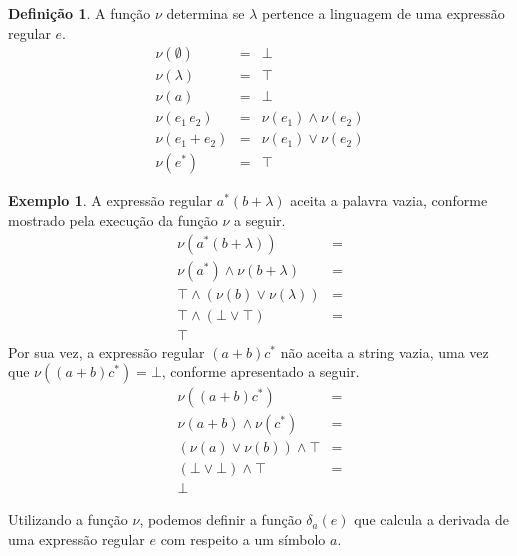 \documentclass[a4paper]{article}
\theoremstyle{definition}
\newtheorem{Example}{Exemplo}
\newtheorem{Definition}{Definição}
\begin{document}
  \begin{Definition}
    A função $\nu$ determina se $\lambda$ pertence a linguagem de uma expressão
    regular $e$.
    \[
      \begin{array}{lcl}
        \nu(\emptyset) & = & \bot\\
        \nu(\lambda)   & = & \top \\
        \nu(a)         & = & \bot \\
        \nu(e_1\,e_2)  & = & \nu(e_1) \land \nu(e_2)\\
        \nu(e_1 + e_2) & = & \nu(e_1) \lor \nu(e_2)\\
        \nu(e^*)       & = & \top  
      \end{array}
    \]
  \end{Definition}  

  \begin{Example}
    A expressão regular $a^*(b + \lambda)$ aceita a palavra vazia, conforme
    mostrado pela execução da função $\nu$ a seguir.
    \[
      \begin{array}{lc}
        \nu(a^*(b + \lambda)) & = \\
        \nu(a^*) \land \nu(b + \lambda) & = \\
        \top \land (\nu(b) \lor \nu(\lambda)) & = \\
        \top \land (\bot \lor \top) & = \\
        \top
      \end{array}
    \]
    Por sua vez, a expressão regular $(a + b)c^*$ não aceita a string vazia,
    uma vez que $\nu((a + b)c^*) = \bot$, conforme apresentado a seguir.
    \[
      \begin{array}{lc}
        \nu((a + b)c^*) & = \\
        \nu(a + b) \land \nu(c^*) & = \\
        (\nu(a) \lor \nu(b)) \land \top & = \\
        (\bot \lor \bot) \land \top & = \\
        \bot
      \end{array}
    \]
  \end{Example}
  
  Utilizando a função $\nu$, podemos definir a função $\delta_a(e)$ que calcula
  a derivada de uma expressão regular $e$ com respeito a um símbolo $a$.
\end{document}
